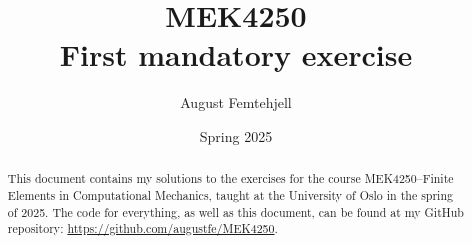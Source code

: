 \documentclass[a4paper,12pt]{article}
\title{
    MEK4250\\
    \small{First mandatory exercise}
}
\author{August Femtehjell}
\date{Spring 2025}
\theoremstyle{exerciseStyle}
\theoremstyle{solutionStyle}
\begin{document}
\maketitle

\tableofcontents

\begin{abstract}
    This document contains my solutions to the exercises for the course MEK4250--Finite Elements in Computational Mechanics, taught at the University of Oslo in the spring of 2025.
    The code for everything, as well as this document, can be found at my GitHub repository: \url{https://github.com/augustfe/MEK4250}.
\end{abstract}


\end{document}
